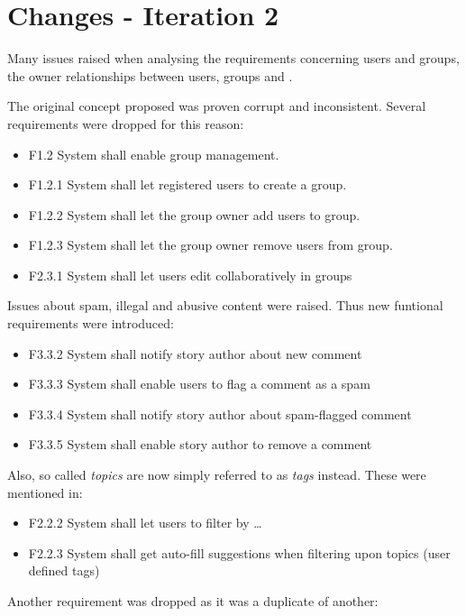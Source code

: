 \documentclass[11pt]{book}
\begin{document}
\section{Changes - Iteration 2}\label{changes---iteration-2}

Many issues raised when analysing the requirements concerning users and
groups, the owner relationships between users, groups and \wallentityp.

The original concept proposed was proven corrupt and inconsistent.
Several requirements were dropped for this reason:

\begin{itemize}
  \item F1.2 System shall enable group management.
  \item F1.2.1 System shall let registered users to create a group.
  \item F1.2.2 System shall let the group owner add users to group.
  \item F1.2.3 System shall let the group owner remove users from group.
  \item F2.3.1 System shall let users edit \wallentityp collaboratively in groups
\end{itemize}

Issues about spam, illegal and abusive content were raised. Thus new
funtional requirements were introduced:

\begin{itemize}
  \item F3.3.2 System shall notify story author about new comment
  \item F3.3.3 System shall enable users to flag a comment as a spam
  \item F3.3.4 System shall notify story author about spam-flagged comment
  \item F3.3.5 System shall enable story author to remove a comment
\end{itemize}

Also, so called \emph{topics} are now simply referred to as \emph{tags}
instead. These were mentioned in:

\begin{itemize}
  \item F2.2.2 System shall let users to filter \wallentityp by \ldots{}
  \item F2.2.3 System shall get auto-fill suggestions when filtering upon
  topics (user defined tags)
\end{itemize}

Another requirement was dropped as it was a duplicate of another:
\end{document}
